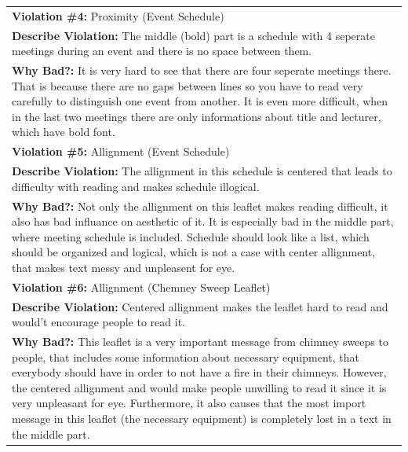 \documentclass[a4paper,11pt,oneside]{scrreprt}
\begin{document}
\begin{tabularx}{\textwidth}{|X|}
	\hline	
	
	\textbf{Violation \#4:} Proximity (Event Schedule)
	
	\\
	\textbf{Describe Violation:} The middle (bold) part is a schedule with 4 seperate meetings during an event and there is no space between them.
	
	\\
	\textbf{Why Bad?:} It is very hard to see that there are four seperate meetings there. That is because there are no gaps between lines so you have to read very carefully to distinguish one event from another. It is even more difficult, when in the last two meetings there are only informations about title and lecturer, which have bold font.
	
	\\
	\hline	
	
	\textbf{Violation \#5:} Allignment (Event Schedule)
	
	\\
	\textbf{Describe Violation:} The allignment in this schedule is centered that leads to difficulty with reading and makes schedule illogical. 
	
	\\
	\textbf{Why Bad?:} Not only the allignment on this leaflet makes reading difficult, it also has bad influance on aesthetic of it. It is especially bad in the middle part, where meeting schedule is included. Schedule should look like a list, which should be organized and logical, which is not a case with center allignment, that makes text messy and unpleasent for eye.
	
	\\
	\hline	
	
	\textbf{Violation \#6:} Allignment (Chemney Sweep Leaflet)
	
	\\
	\textbf{Describe Violation:} Centered allignment makes the leaflet hard to read and would't encourage people to read it.
	
	\\
	\textbf{Why Bad?:} This leaflet is a very important message from chimney sweeps to people, that includes some information about necessary equipment, that everybody should have in order to not have a fire in their chimneys. However, the centered allignment and would make people unwilling to read it since it is very unpleasant for eye. Furthermore, it also causes that the most import message in this leaflet (the necessary equipment) is completely lost in a text in the middle part.
	
	\\
	\hline	
	
\end{tabularx}\\
\end{document}
